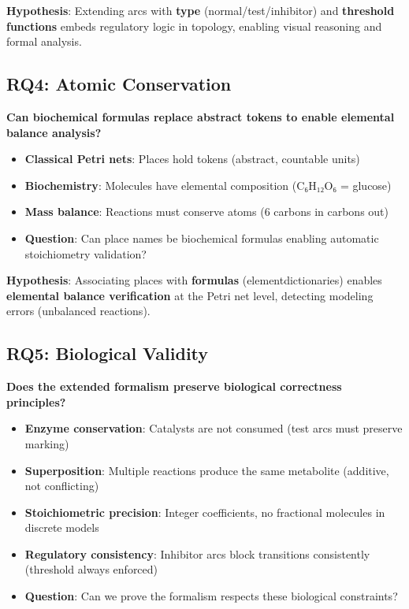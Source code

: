 \textbf{Hypothesis}: Extending arcs with \textbf{type}
(normal/test/inhibitor) and \textbf{threshold functions} embeds
regulatory logic in topology, enabling visual reasoning and formal
analysis.

\hypertarget{rq4-atomic-conservation}{%
\subsection{RQ4: Atomic Conservation}\label{rq4-atomic-conservation}}

\textbf{Can biochemical formulas replace abstract tokens to enable
elemental balance analysis?}

\begin{itemize}
\tightlist
\item
  \textbf{Classical Petri nets}: Places hold tokens (abstract, countable
  units)
\item
  \textbf{Biochemistry}: Molecules have elemental composition (C₆H₁₂O₆ =
  glucose)
\item
  \textbf{Mass balance}: Reactions must conserve atoms (6 carbons in 
  carbons out)
\item
  \textbf{Question}: Can place names be biochemical formulas enabling
  automatic stoichiometry validation?
\end{itemize}

\textbf{Hypothesis}: Associating places with \textbf{formulas}
(element\textrightarrowcount dictionaries) enables \textbf{elemental balance
verification} at the Petri net level, detecting modeling errors
(unbalanced reactions).

\hypertarget{rq5-biological-validity}{%
\subsection{RQ5: Biological Validity}\label{rq5-biological-validity}}

\textbf{Does the extended formalism preserve biological correctness
principles?}

\begin{itemize}
\tightlist
\item
  \textbf{Enzyme conservation}: Catalysts are not consumed (test arcs
  must preserve marking)
\item
  \textbf{Superposition}: Multiple reactions produce the same metabolite
  (additive, not conflicting)
\item
  \textbf{Stoichiometric precision}: Integer coefficients, no fractional
  molecules in discrete models
\item
  \textbf{Regulatory consistency}: Inhibitor arcs block transitions
  consistently (threshold always enforced)
\item
  \textbf{Question}: Can we prove the formalism respects these
  biological constraints?
\end{itemize}

